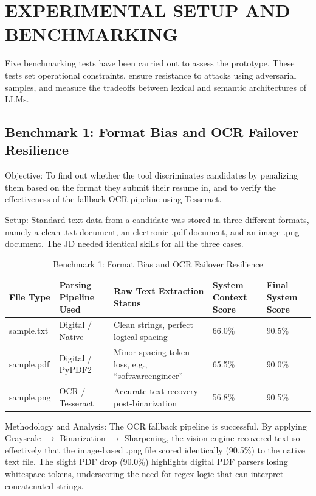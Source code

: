 \chapter{EXPERIMENTAL SETUP AND BENCHMARKING}

Five benchmarking tests have been carried out to assess the prototype. These tests set operational constraints, ensure resistance to attacks using adversarial samples, and measure the tradeoffs between lexical and semantic architectures of LLMs.

\section{Benchmark 1: Format Bias and OCR Failover Resilience}
Objective: To find out whether the tool discriminates candidates by penalizing them based on the format they submit their resume in, and to verify the effectiveness of the fallback OCR pipeline using Tesseract.

Setup: Standard text data from a candidate was stored in three different formats, namely a clean .txt document, an electronic .pdf document, and an image .png document. The JD needed identical skills for all the three cases.

\begin{table}[H]
\centering
\caption{Benchmark 1: Format Bias and OCR Failover Resilience}
\begin{tabularx}{\textwidth}{p{}p{}Y p{0.16\textwidth}p{0.15\textwidth}}
\toprule
\textbf{File Type} & \textbf{Parsing Pipeline Used} & \textbf{Raw Text Extraction Status} & \textbf{System Context Score} & \textbf{Final System Score}\\
\midrule
sample.txt & Digital / Native & Clean strings, perfect logical spacing & 66.0\% & 90.5\%\\
sample.pdf & Digital / PyPDF2 & Minor spacing token loss, e.g., ``softwareengineer'' & 65.5\% & 90.0\%\\
sample.png & OCR / Tesseract & Accurate text recovery post-binarization & 56.8\% & 90.5\%\\
\bottomrule
\end{tabularx}
\end{table}

Methodology and Analysis: The OCR fallback pipeline is successful. By applying Grayscale \(\rightarrow\) Binarization \(\rightarrow\) Sharpening, the vision engine recovered text so effectively that the image-based .png file scored identically (90.5\%) to the native text file. The slight PDF drop (90.0\%) highlights digital PDF parsers losing whitespace tokens, underscoring the need for regex logic that can interpret concatenated strings.

